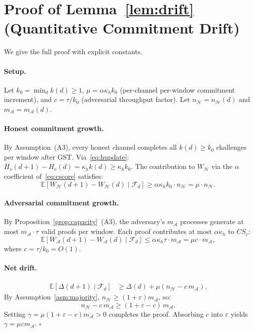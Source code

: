 \documentclass[10pt,journal,twoside]{IEEEtran}
\theoremstyle{remark}
\newcommand{\CS}{\mathit{CS}}
\begin{document}
	\section{Proof of Lemma~\ref{lem:drift}
		(Quantitative Commitment Drift)}
	\label{app:drift}
	
	We give the full proof with explicit constants.
	
	\paragraph{Setup.}
	Let $k_0 = \min_d k(d) \geq 1$,
	$\mu = \alpha\kappa_h k_0$ (per-channel per-window
	commitment increment), and $c = \tau/k_0$
	(adversarial throughput factor).
	Let $n_{\mathcal{H}} = n_{\mathcal{H}}(d)$ and
	$m_{\mathcal{A}} = m_{\mathcal{A}}(d)$.
	
	\paragraph{Honest commitment growth.}
	By Assumption~(A3), every honest channel completes
	all $k(d) \geq k_0$ challenges per window after GST.
	Via~\eqref{eq:hupdate}:
	$H_v(d+1) - H_v(d) = \kappa_h k(d) \geq \kappa_h k_0$.
	The contribution to $W_{\mathcal{H}}$ via the $\alpha$
	coefficient of~\eqref{eq:cscore} satisfies:
	\[
	\mathbb{E}[W_{\mathcal{H}}(d+1) - W_{\mathcal{H}}(d)
	\mid \mathcal{F}_d]
	\geq \alpha\kappa_h k_0 \cdot n_{\mathcal{H}}
	= \mu \cdot n_{\mathcal{H}}.
	\]
	
	\paragraph{Adversarial commitment growth.}
	By Proposition~\ref{prop:capacity}~(A3), the adversary's
	$m_{\mathcal{A}}$ processes generate at most
	$m_{\mathcal{A}} \cdot \tau$ valid proofs per window.
	Each proof contributes at most $\alpha\kappa_h$ to $\CS_v$:
	\[
	\mathbb{E}[W_{\mathcal{A}}(d+1) - W_{\mathcal{A}}(d)
	\mid \mathcal{F}_d]
	\leq \alpha\kappa_h\tau \cdot m_{\mathcal{A}}
	= \mu c \cdot m_{\mathcal{A}},
	\]
	where $c = \tau/k_0 = O(1)$.
	
	\paragraph{Net drift.}
	\begin{align*}
		\mathbb{E}[\Delta(d+1) \mid \mathcal{F}_d]
		&\geq \Delta(d)
		+ \mu(n_{\mathcal{H}} - c\,m_{\mathcal{A}}).
	\end{align*}
	By Assumption~\ref{asm:majority},
	$n_{\mathcal{H}} \geq (1+\varepsilon)m_{\mathcal{A}}$, so:
	\[
	n_{\mathcal{H}} - c\,m_{\mathcal{A}}
	\geq (1+\varepsilon-c)\,m_{\mathcal{A}}.
	\]
	Setting $\gamma = \mu(1+\varepsilon-c)m_{\mathcal{A}} > 0$
	completes the proof.
	Absorbing $c$ into $\varepsilon$ yields
	$\gamma = \mu\varepsilon m_{\mathcal{A}}$.
	\hfill$\square$
	
\end{document}
